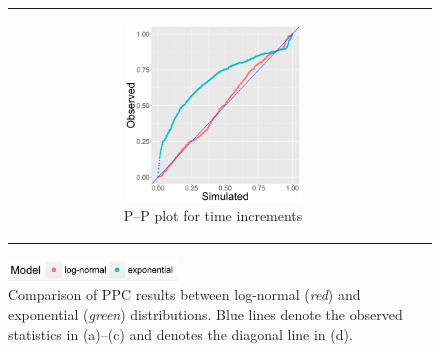 \documentclass[ba]{imsart}
\numberwithin{equation}{section}
\theoremstyle{plain}
\begin{document}
\begin{figure}[H]
\begin{tabular}[t]{cc}
\begin{subfigure}[b]{0.495\textwidth}
				\end{subfigure}
				\begin{subfigure}[b]{0.495\textwidth}
					\centering
					\caption{P--P plot for time increments}
					\includegraphics[width=0.56\textwidth]{img/timePPplot2-1.png}
				\end{subfigure}
			\end{tabular}
			\includegraphics[width=0.4\textwidth]{img/modellabel.png}
			\caption {Comparison of PPC results between log-normal (\textit{red}) and exponential (\textit{green}) distributions. Blue lines denote the observed statistics in (a)--(c) and denotes the diagonal line in (d).}
			\label{figure:PPCtwo}
		\end{figure}
		\newpage
\end{document}
